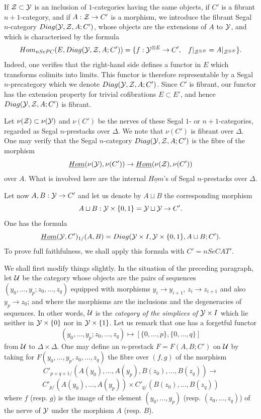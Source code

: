 If ${\cal Z} \subset {\cal Y}$ is an inclusion of $1$-categories having the same
objects, if $C'$ is a fibrant $n+1$-category, and if $A : {\cal Z} \rightarrow
C'$ is a
morphism, we introduce the fibrant Segal $n$-category $Diag ({\cal Y} , {\cal Z} ,
A; C')$, whose objects are the extensions of $A$ to ${\cal Y}$, and which
is characterised by the formula
$$
Hom _{nSePC}(E,Diag ({\cal Y} , {\cal Z} , A;C'))=\{ f: {\cal Y} ^{\otimes E} \rightarrow C',
\;\;\; f|_{{\cal Z} ^{\otimes E}} = A|_{{\cal Z} ^{\otimes E}} \} .
$$
Indeed, one verifies that the right-hand side defines a functor
in $E$ which
transforms colimits into limits. This functor is therefore
representable by a Segal $n$-precategory which we denote
$Diag ({\cal Y} , {\cal Z} ,
A;C')$.
Since $C'$ is
fibrant, our functor has the extension property for
trivial cofibrations $E\subset E'$, and hence $Diag ({\cal Y} , {\cal Z} , A;C')$ is
fibrant.

Let $\nu ({\cal Z} )\subset \nu ({\cal Y} )$ and $\nu (C')$ be the nerves of these Segal
$1$- or
$n+1$-categories, regarded as Segal $n$-prestacks
over $\Delta$. We note that $\nu (C' )$ is fibrant over
$\Delta$. One may verify
that the Segal $n$-category $Diag ({\cal Y} , {\cal Z} , A;C')$  is the fibre of the
morphism
$$
\underline{Hom}(\nu ({\cal Y} ), \nu (C' ))
\rightarrow
\underline{Hom}(\nu ({\cal Z} ), \nu (C' ))
$$
over $A$. What is involved here are the internal $\underline{Hom}$'s of Segal
$n$-prestacks over $\Delta$.

Let now $A,B: {\cal Y} \rightarrow C'$ and let us denote by $A\sqcup B$ the
corresponding morphism
$$
A\sqcup B:{\cal Y} \times \{ 0,1\} = {\cal Y} \sqcup {\cal Y} \rightarrow C'.
$$
One has the formula
$$
\underline{Hom}({\cal Y} , C')_{1/}(A,B) = Diag ({\cal Y} \times I, {\cal Y} \times \{ 0,1\} ,
A\sqcup B ; C').
$$
To prove full faithfulness, we shall apply this formula
with
$C'=nSeCAT'$.

We shall first modify things slightly.
In the situation of the preceding
paragraph, let ${\cal U}$ be the category whose objects are the pairs of
sequences $(y_0,\ldots , y_p; z_0, \ldots , z_q)$ equipped with morphisms
$y_i\rightarrow y_{i+1}$,
$z_i\rightarrow z_{i+1}$ and also $y_p\rightarrow z_0$; and where the
morphisms
are the inclusions and the degeneracies of sequences.
In other words, ${\cal U}$ is the \emph{category of the simplices of ${\cal Y} \times I$}
which lie neither in ${\cal Y} \times \{ 0\}$ nor in ${\cal Y} \times
\{ 1\}$. Let us remark that one has a forgetful functor
$$
(y_0,\ldots , y_p; z_0, \ldots , z_q)\mapsto
[\{ 0,\ldots , p\} , \{ 0,\ldots ,
q\} ]
$$
from
${\cal U}$  to $\Delta \times \Delta$.
One may define
an $n$-prestack $F = F(A,B; C')$ on
${\cal U}$ by taking for
$F(y_0,\ldots , y_p,z_0,\ldots ,z_q)$
the fibre over
$(f,g)$ of the morphism
$$
C'_{p+q+1/}(A(y_0),\ldots , A(y_p),B(z_0),\ldots , B(z_q))
\rightarrow
$$
$$
C'_{p/}(A(y_0),\ldots , A(y_p))\times
C'_{q/}(B(z_0),\ldots , B(z_q))
$$
where $f$ (resp. $g$) is the image of the element $(y_0,\ldots , y_p)$
(resp. $(z_0,\ldots , z_q)$) of the nerve of ${\cal Y}$ under the morphism $A$ (resp. $B$).


